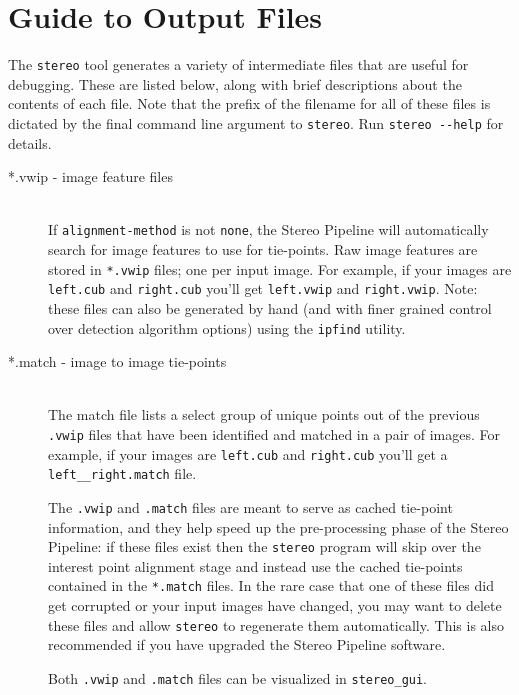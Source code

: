 \chapter{Guide to Output Files}
\label{chapter:outputfiles}

The {\tt stereo} tool generates a variety of intermediate files that
are useful for debugging.  These are listed below, along with brief
descriptions about the contents of each file.  Note that the prefix of
the filename for all of these files is dictated by the final command
line argument to {\tt stereo}.  Run {\tt stereo -\/-help} for details.

\begin{description}

\item[*.vwip \textnormal{- image feature files}] \hfill \\
  If \texttt{alignment-method} is not \texttt{none}, the Stereo
  Pipeline will automatically search for image features to use for
  tie-points.  Raw image features are stored in \texttt{*.vwip} files;
  one per input image. For example, if your images are
  \texttt{left.cub} and \texttt{right.cub} you'll get
  \texttt{left.vwip} and \texttt{right.vwip}.  Note: these files can
  also be generated by hand (and with finer grained control over
  detection algorithm options) using the {\tt ipfind} utility.

\item[*.match \textnormal{- image to image tie-points}] \hfill \\
  The match file lists a select group of unique points out of the
  previous \texttt{.vwip} files that have been identified and matched
  in a pair of images.  For example, if your images are
  \texttt{left.cub} and \texttt{right.cub} you'll get a
  \texttt{left\_\_right.match} file.

  The \texttt{.vwip} and \texttt{.match} files are meant to serve
  as cached tie-point information, and they help speed up the
  pre-processing phase of the Stereo Pipeline: if these files exist
  then the \texttt{stereo} program will skip over the interest point
  alignment stage and instead use the cached tie-points contained
  in the \texttt{*.match} files.  In the rare case that one of these files
  did get corrupted or your input images have changed, you may want
  to delete these files and allow {\tt stereo} to regenerate them
  automatically.  This is also recommended if you have upgraded the
  Stereo Pipeline software.

  Both \texttt{.vwip} and \texttt{.match} files can be visualized in
  \texttt{stereo\_gui}.


\end{description}
